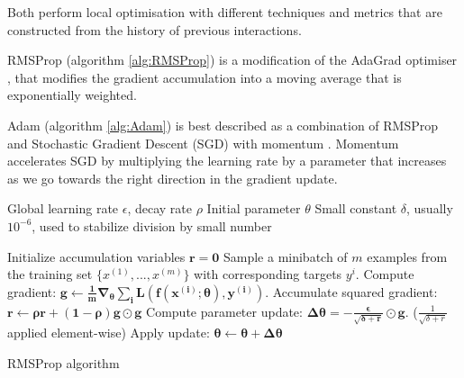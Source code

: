 Both perform local optimisation with different techniques and metrics that are constructed from the history of previous interactions.

RMSProp (algorithm \ref{alg:RMSProp}) is a modification of the AdaGrad optimiser \citep{duchi2011adaptive}, that modifies the gradient accumulation into a moving average that is exponentially weighted.

Adam (algorithm \ref{alg:Adam}) is best described as a combination of RMSProp and Stochastic Gradient Descent (SGD) with momentum \citep{sutskever2013importance}. Momentum accelerates SGD by multiplying the learning rate by a parameter that increases as we go towards the right direction in the gradient update.

\begin{algorithm}[ht]
\begin{algorithmic}
    Global learning rate $\epsilon$, decay rate $\rho$
    Initial parameter $\theta$
    Small constant $\delta$, usually $10^{-6}$, used to stabilize division by small number
   
   \STATE Initialize accumulation variables $\boldsymbol{r=0}$
   \STATE Sample a minibatch of $m$ examples from the training set $\{x^{(1)},...,x^{(m)}\}$ with corresponding targets $y^{i}$.
   \STATE Compute gradient: $\boldsymbol{g \leftarrow \frac{1}{m}\nabla_\theta \sum_i L(f(x^{(i)}; \theta), y^{(i)}).}$
   \STATE Accumulate squared gradient: \\ $\boldsymbol{r \leftarrow \rho r + (1 - \rho) g \odot g}$
   \STATE Compute parameter update: $\boldsymbol{\Delta\theta = -\frac{\epsilon}{\sqrt{\delta+r}} \odot g.}$ ($\frac{1}{\sqrt{\delta+r}}$ applied element-wise)
   \STATE Apply update: $\boldsymbol{\theta \leftarrow \theta + \Delta \theta}$
   \ENDWHILE
\end{algorithmic}
  \caption{RMSProp algorithm}
  \label{alg:RMSProp}
\end{algorithm}


